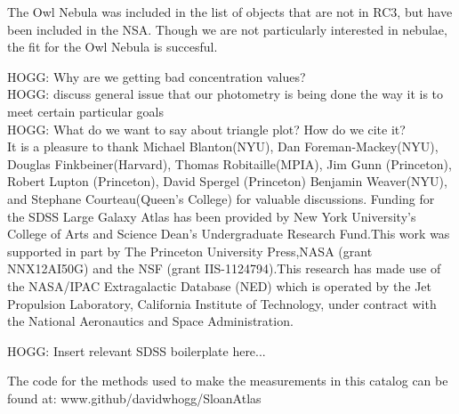 \documentclass[12pt,preprint,pdftex]{aastex}
\begin{document}
The Owl Nebula was included in the list of objects that are not in
RC3, but have been included in the NSA. Though we are not
particularly interested in nebulae, the fit for the Owl Nebula is
succesful. 

HOGG: Why are we getting bad concentration values?\\
HOGG: discuss general issue that our photometry is being done the way it is to meet certain particular goals\\
HOGG: What do we want to say about triangle plot? How do we cite it?\\

\acknowledgements It is a pleasure to thank Michael Blanton(NYU), Dan
Foreman-Mackey(NYU), Douglas Finkbeiner(Harvard), Thomas
Robitaille(MPIA), Jim Gunn (Princeton),
Robert Lupton (Princeton), David Spergel (Princeton) Benjamin
Weaver(NYU), and Stephane Courteau(Queen's College) for valuable
discussions. Funding for the SDSS Large Galaxy Atlas has been provided
by New York University's College of Arts and Science Dean's
Undergraduate Research Fund.This work was supported in part by The
Princeton University Press,NASA (grant NNX12AI50G) and the NSF (grant
IIS-1124794).This research has made use of the NASA/IPAC Extragalactic
Database (NED) which is operated by the Jet Propulsion Laboratory,
California Institute of Technology, under contract with the National
Aeronautics and Space Administration.

HOGG: Insert relevant SDSS boilerplate here...

The code for the methods used to make the measurements in this catalog
can be found at: www.github/davidwhogg/SloanAtlas
\end{document}
